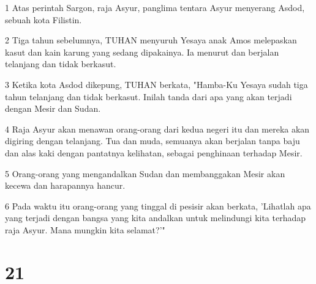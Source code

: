 \par 1 Atas perintah Sargon, raja Asyur, panglima tentara Asyur menyerang Asdod, sebuah kota Filistin.
\par 2 Tiga tahun sebelumnya, TUHAN menyuruh Yesaya anak Amos melepaskan kasut dan kain karung yang sedang dipakainya. Ia menurut dan berjalan telanjang dan tidak berkasut.
\par 3 Ketika kota Asdod dikepung, TUHAN berkata, "Hamba-Ku Yesaya sudah tiga tahun telanjang dan tidak berkasut. Inilah tanda dari apa yang akan terjadi dengan Mesir dan Sudan.
\par 4 Raja Asyur akan menawan orang-orang dari kedua negeri itu dan mereka akan digiring dengan telanjang. Tua dan muda, semuanya akan berjalan tanpa baju dan alas kaki dengan pantatnya kelihatan, sebagai penghinaan terhadap Mesir.
\par 5 Orang-orang yang mengandalkan Sudan dan membanggakan Mesir akan kecewa dan harapannya hancur.
\par 6 Pada waktu itu orang-orang yang tinggal di pesisir akan berkata, 'Lihatlah apa yang terjadi dengan bangsa yang kita andalkan untuk melindungi kita terhadap raja Asyur. Mana mungkin kita selamat?'"

\chapter{21}

